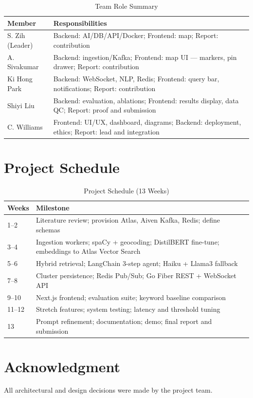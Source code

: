 \documentclass[conference]{IEEEtran}
\begin{document}
\begin{table}[h]
\caption{Team Role Summary}
\label{tab:roles}
\renewcommand{\arraystretch}{1.2}
\begin{tabular}{p{2.0cm} p{5.8cm}}
\toprule
\textbf{Member} & \textbf{Responsibilities} \\
\midrule
S. Zih (Leader) & Backend: AI/DB/API/Docker; Frontend: map; Report: contribution \\
A. Sivakumar & Backend: ingestion/Kafka; Frontend: map UI --- markers, pin drawer; Report: contribution \\
Ki Hong Park & Backend: WebSocket, NLP, Redis; Frontend: query bar, notifications; Report: contribution \\
Shiyi Liu & Backend: evaluation, ablations; Frontend: results display, data QC; Report: proof and submission \\
C. Williams & Frontend: UI/UX, dashboard, diagrams; Backend: deployment, ethics; Report: lead and integration \\
\bottomrule
\end{tabular}
\end{table}

\section{Project Schedule}

\begin{table}[h]
\caption{Project Schedule (13 Weeks)}
\label{tab:schedule}
\renewcommand{\arraystretch}{1.3}
\begin{tabular}{p{1.0cm} p{6.4cm}}
\toprule
\textbf{Weeks} & \textbf{Milestone} \\
\midrule
1--2 & Literature review; provision Atlas, Aiven Kafka, Redis; define schemas \\
3--4 & Ingestion workers; spaCy + geocoding; DistilBERT fine-tune; embeddings to Atlas Vector Search \\
5--6 & Hybrid retrieval; LangChain 3-step agent; Haiku + Llama3 fallback \\
7--8 & Cluster persistence; Redis Pub/Sub; Go Fiber REST + WebSocket API \\
9--10 & Next.js frontend; evaluation suite; keyword baseline comparison \\
11--12 & Stretch features; system testing; latency and threshold tuning \\
13 & Prompt refinement; documentation; demo; final report and submission \\
\bottomrule
\end{tabular}
\end{table}

\section{Acknowledgment}

All architectural and design decisions were made by the project team.
\end{document}
